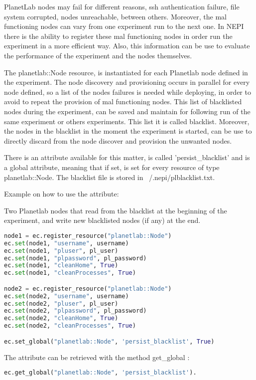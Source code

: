 PlanetLab nodes may fail for different reasons, ssh authentication failure, file system corrupted, nodes unreachable, between others. Moreover, the mal functioning nodes can vary from one experiment run to the next one. In NEPI there is the ability to register these mal functioning nodes in order run the experiment in a more efficient way. Also, this information can be use to evaluate the performance of the experiment and the nodes themselves.

The planetlab::Node resource, is instantiated for each Planetlab node defined in the experiment. The node discovery and provisioning occurs in parallel for every node defined, so a list of the nodes failures is needed while deploying, in order to avoid to repeat the provision of mal functioning nodes. This list of blacklisted nodes during the experiment, can be saved and maintain for following run of the same experiment or others experiments. This list it is called blacklist. Moreover, the nodes in the blacklist in the moment the experiment is started, can be use to directly discard from the node discover and provision the unwanted nodes.

There is an attribute available for this matter, is called 'persist\_blacklist' and is a global attribute, meaning that if set, is set for every resource of type planetlab::Node.
The blacklist file is stored in ~/.nepi/plblacklist.txt.

Example on how to use the attribute:

Two Planetlab nodes that read from the blacklist at the beginning of the experiment, and write new blacklisted nodes (if any) at the end.
\begin{lstlisting}[language=Python]
node1 = ec.register_resource("planetlab::Node")
ec.set(node1, "username", username)
ec.set(node1, "pluser", pl_user)
ec.set(node1, "plpassword", pl_password)
ec.set(node1, "cleanHome", True)
ec.set(node1, "cleanProcesses", True)

node2 = ec.register_resource("planetlab::Node")
ec.set(node2, "username", username)
ec.set(node2, "pluser", pl_user)
ec.set(node2, "plpassword", pl_password)
ec.set(node2, "cleanHome", True)
ec.set(node2, "cleanProcesses", True)

ec.set_global("planetlab::Node", 'persist_blacklist', True)
\end{lstlisting}
The attribute can be retrieved with the method get\_global :
\begin{lstlisting}[language=Python]
ec.get_global("planetlab::Node", 'persist_blacklist').
\end{lstlisting}
